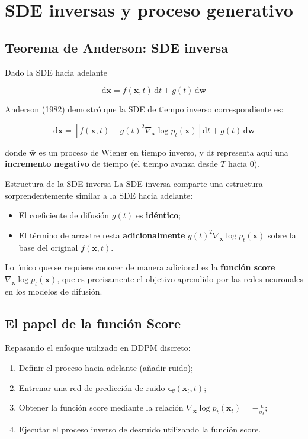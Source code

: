\documentclass[a4paper]{article}
\begin{document}
\section{SDE inversas y proceso generativo}

\subsection{Teorema de Anderson: SDE inversa}

Dado la SDE hacia adelante

$$
\mathrm{d}\mathbf{x} = f(\mathbf{x}, t)\,\mathrm{d}t + g(t)\,\mathrm{d}\mathbf{w}
$$

Anderson (1982) demostró que la SDE de tiempo inverso correspondiente es:

$$
\mathrm{d}\mathbf{x} = \left[f(\mathbf{x}, t) - g(t)^2 \nabla_{\mathbf{x}} \log p_t(\mathbf{x})\right]\mathrm{d}t + g(t)\,\mathrm{d}\bar{\mathbf{w}}
$$

donde $\bar{\mathbf{w}}$ es un proceso de Wiener en tiempo inverso, y $\mathrm{d}t$ representa aquí una \textbf{incremento negativo} de tiempo (el tiempo avanza desde $T$ hacia 0).

\begin{importantbox}{Estructura de la SDE inversa}
La SDE inversa comparte una estructura sorprendentemente similar a la SDE hacia adelante:
\begin{itemize}
    \item El coeficiente de difusión $g(t)$ es \textbf{idéntico};
    \item El término de arrastre resta \textbf{adicionalmente} $g(t)^2 \nabla_{\mathbf{x}} \log p_t(\mathbf{x})$ sobre la base del original $f(\mathbf{x}, t)$.
\end{itemize}
Lo único que se requiere conocer de manera adicional es la \textbf{función score} $\nabla_{\mathbf{x}} \log p_t(\mathbf{x})$, que es precisamente el objetivo aprendido por las redes neuronales en los modelos de difusión.
\end{importantbox}

\subsection{El papel de la función Score}

Repasando el enfoque utilizado en DDPM discreto:
\begin{enumerate}
    \item Definir el proceso hacia adelante (añadir ruido);
    \item Entrenar una red de predicción de ruido $\boldsymbol{\epsilon}_\theta(\mathbf{x}_t, t)$;
    \item Obtener la función score mediante la relación $\nabla_{\mathbf{x}} \log p_t(\mathbf{x}_t) = -\frac{\boldsymbol{\epsilon}}{\sigma_t}$;
    \item Ejecutar el proceso inverso de desruido utilizando la función score.
\end{enumerate}
\end{document}
